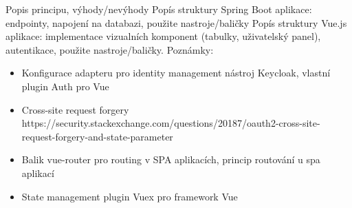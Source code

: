 \documentclass[12pt]{article}
\begin{document}
Popis principu, výhody/nevýhody
Popís struktury Spring Boot aplikace: endpointy, napojení na databazi, 
použite nastroje/baličky
Popís struktury Vue.js aplikace: implementace vizualních komponent 
(tabulky, uživatelský panel), autentikace, použite nastroje/baličky. 
\newline
\newline
Poznámky:
\begin{itemize}
    \item Konfigurace adapteru pro identity management nástroj Keycloak, vlastní plugin Auth pro Vue
    \item Cross-site request forgery https://security.stackexchange.com/questions/20187/oauth2-cross-site-request-forgery-and-state-parameter
    \item Balik vue-router pro routing v SPA aplikacích, princip routování u spa aplikací
    \item State management plugin Vuex pro framework Vue

\end{itemize}
\end{document}
